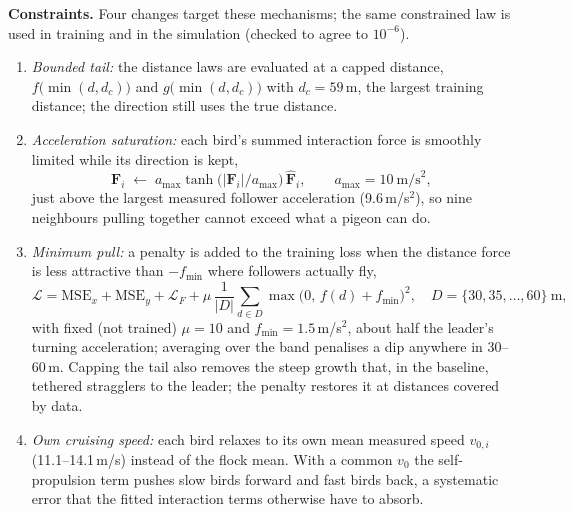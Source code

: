\documentclass[10pt]{article}
\newcommand{\bv}[1]{\mathbf{#1}}
\begin{document}
\textbf{Constraints.} Four changes target these mechanisms; the same constrained law is used in training and in the simulation (checked to agree to $10^{-6}$).
\begin{enumerate}\setlength{\itemsep}{1pt}
\item \emph{Bounded tail:} the distance laws are evaluated at a capped distance, $f\big(\min(d,d_c)\big)$ and $g\big(\min(d,d_c)\big)$ with $d_c=59$\,m, the largest training distance; the direction still uses the true distance.
\item \emph{Acceleration saturation:} each bird's summed interaction force is smoothly limited while its direction is kept,
\begin{equation}
\bv F_i\;\leftarrow\;a_{\max}\tanh\!\big(|\bv F_i|/a_{\max}\big)\,\hat{\bv F}_i,\qquad a_{\max}=10\ \text{m/s}^2,
\end{equation}
just above the largest measured follower acceleration (9.6\,m/s$^2$), so nine neighbours pulling together cannot exceed what a pigeon can do.
\item \emph{Minimum pull:} a penalty is added to the training loss when the distance force is less attractive than $-f_{\min}$ where followers actually fly,
\begin{equation}
\mathcal L=\mathrm{MSE}_x+\mathrm{MSE}_y+\mathcal L_F+\mu\,\frac{1}{|D|}\sum_{d\in D}\max\big(0,\,f(d)+f_{\min}\big)^2,\quad D=\{30,35,\dots,60\}\ \text{m},
\end{equation}
with fixed (not trained) $\mu=10$ and $f_{\min}=1.5$\,m/s$^2$, about half the leader's turning acceleration; averaging over the band penalises a dip anywhere in 30--60\,m. Capping the tail also removes the steep growth that, in the baseline, tethered stragglers to the leader; the penalty restores it at distances covered by data.
\item \emph{Own cruising speed:} each bird relaxes to its own mean measured speed $v_{0,i}$ (11.1--14.1\,m/s) instead of the flock mean. With a common $v_0$ the self-propulsion term pushes slow birds forward and fast birds back, a systematic error that the fitted interaction terms otherwise have to absorb.
\end{enumerate}
\end{document}

